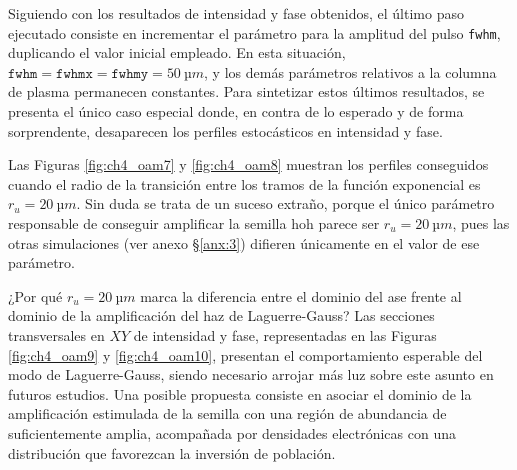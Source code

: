 Siguiendo con los resultados de intensidad y fase obtenidos, el último paso ejecutado consiste en incrementar el parámetro para la amplitud del pulso \texttt{fwhm}, duplicando el valor inicial empleado. En esta situación, $\texttt{fwhm}=\texttt{fwhmx}=\texttt{fwhmy}=\qty{50}{µm}$, y los demás parámetros relativos a la columna de plasma permanecen constantes. Para sintetizar estos últimos resultados, se presenta el único caso especial donde, en contra de lo esperado y de forma sorprendente, desaparecen los perfiles estocásticos en intensidad y fase.

Las Figuras \ref{fig:ch4_oam7} y \ref{fig:ch4_oam8} muestran los perfiles conseguidos cuando el radio de la transición entre los tramos de la función exponencial es $r_{u}=\qty{20}{µm}$. Sin duda se trata de un suceso extraño, porque el único parámetro responsable de conseguir amplificar la semilla \acrshort{hoh} parece ser $r_{u}=\qty{20}{µm}$, pues las otras simulaciones (ver anexo \S\ref{anx:3}) difieren únicamente en el valor de ese parámetro.

¿Por qué $r_{u}=\qty{20}{µm}$ marca la diferencia entre el dominio del \acrshort{ase} frente al dominio de la amplificación del haz de Laguerre-Gauss? Las secciones transversales en $XY$ de intensidad y fase, representadas en las Figuras \ref{fig:ch4_oam9} y \ref{fig:ch4_oam10}, presentan el comportamiento esperable del modo de Laguerre-Gauss, siendo necesario arrojar más luz sobre este asunto en futuros estudios. Una posible propuesta consiste en asociar el dominio de la amplificación estimulada de la semilla con una región de abundancia de  suficientemente amplia, acompañada por densidades electrónicas con una distribución que favorezcan la inversión de población.

